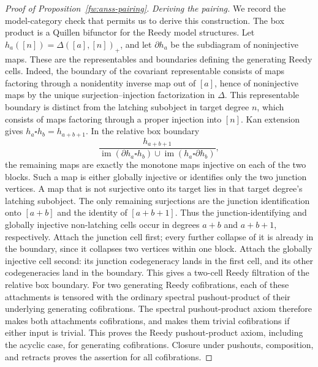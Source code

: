 \begin{proof}[Proof of Proposition~\ref{fw:anss-pairing}]
\smallskip\noindent\emph{Deriving the pairing.}
We record the model-category check that permits us to derive this
construction.  The box product is a Quillen bifunctor for the Reedy
model structures.  Let $h_a([n])=\Delta([a],[n])_+$, and let
$\partial h_a$ be the subdiagram of noninjective maps.  These are the
representables and boundaries defining the generating Reedy cells.
Indeed, the boundary of the covariant representable consists of maps
factoring through a nonidentity inverse map out of $[a]$, hence of
noninjective maps by the unique surjection--injection factorization in
$\Delta$. This representable boundary is distinct from the latching
subobject in target degree $n$, which consists of maps factoring through
a proper injection into $[n]$.
Kan extension gives $h_a\square h_b=h_{a+b+1}$.  In the relative box
boundary
\[
 \frac{h_{a+b+1}}
 {\operatorname{im}(\partial h_a\square h_b)
       \cup\operatorname{im}(h_a\square\partial h_b)},
\]
the remaining maps are exactly the monotone maps injective on each of
the two blocks.  Such a map is either globally injective or identifies
only the two junction vertices. A map that is not surjective onto its
target lies in that target degree's latching subobject. The only
remaining surjections are the junction identification onto $[a+b]$
and the identity of $[a+b+1]$. Thus the junction-identifying and globally
injective non-latching cells occur in degrees $a+b$ and $a+b+1$,
respectively.  Attach the junction cell first;
every further collapse of it is already in the boundary, since it
collapses two vertices within one block.  Attach the globally injective
cell second: its junction codegeneracy lands in the first cell, and
its other codegeneracies land in the boundary. This gives a two-cell
Reedy filtration of the relative box boundary. For two generating
Reedy cofibrations, each of these attachments is tensored with the
ordinary spectral pushout-product of their underlying generating
cofibrations. The spectral pushout-product axiom therefore makes both
attachments cofibrations, and makes them trivial cofibrations if either
input is trivial. This proves the Reedy pushout-product axiom, including
the acyclic case, for generating cofibrations.  Closure under pushouts,
composition, and retracts proves the assertion for all cofibrations.


\end{proof}
